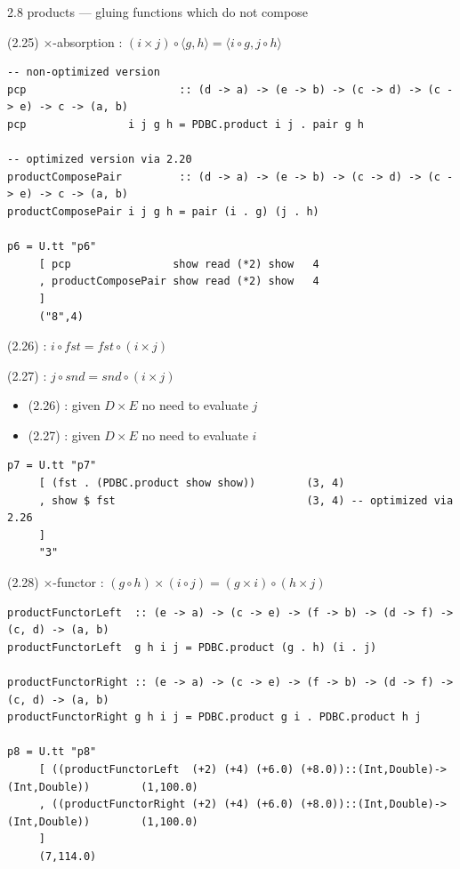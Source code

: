 \documentclass[presentation]{beamer}
\begin{document}
\begin{frame}[fragile,label=sec-7]{2.8 products --- gluing functions which do not compose}
\begin{block}{(2.25) $\times$-absorption : $(i \times j) \circ \langle g,h \rangle = \langle i \circ g,j \circ h \rangle$}
\begin{verbatim}
-- non-optimized version
pcp                        :: (d -> a) -> (e -> b) -> (c -> d) -> (c -> e) -> c -> (a, b)
pcp                i j g h = PDBC.product i j . pair g h

-- optimized version via 2.20
productComposePair         :: (d -> a) -> (e -> b) -> (c -> d) -> (c -> e) -> c -> (a, b)
productComposePair i j g h = pair (i . g) (j . h)

p6 = U.tt "p6"
     [ pcp                show read (*2) show   4
     , productComposePair show read (*2) show   4
     ]
     ("8",4)
\end{verbatim}
\end{block}

\begin{block}{(2.26) : $i \circ fst = fst \circ (i \times j)$}
\end{block}
\begin{block}{(2.27) : $j \circ snd = snd \circ (i \times j)$}
\begin{itemize}
\item (2.26) : given $D \times E$ no need to evaluate $j$
\item (2.27) : given $D \times E$ no need to evaluate $i$
\end{itemize}

\begin{verbatim}
p7 = U.tt "p7"
     [ (fst . (PDBC.product show show))        (3, 4)
     , show $ fst                              (3, 4) -- optimized via 2.26
     ]
     "3"
\end{verbatim}
\end{block}

\begin{block}{(2.28) $\times$-functor : $(g \circ h) \times (i \circ j) = (g \times i) \circ (h \times j)$}
\begin{verbatim}
productFunctorLeft  :: (e -> a) -> (c -> e) -> (f -> b) -> (d -> f) -> (c, d) -> (a, b)
productFunctorLeft  g h i j = PDBC.product (g . h) (i . j)

productFunctorRight :: (e -> a) -> (c -> e) -> (f -> b) -> (d -> f) -> (c, d) -> (a, b)
productFunctorRight g h i j = PDBC.product g i . PDBC.product h j

p8 = U.tt "p8"
     [ ((productFunctorLeft  (+2) (+4) (+6.0) (+8.0))::(Int,Double)->(Int,Double))        (1,100.0)
     , ((productFunctorRight (+2) (+4) (+6.0) (+8.0))::(Int,Double)->(Int,Double))        (1,100.0)
     ]
     (7,114.0)
\end{verbatim}
\end{block}


\end{frame}
\end{document}
